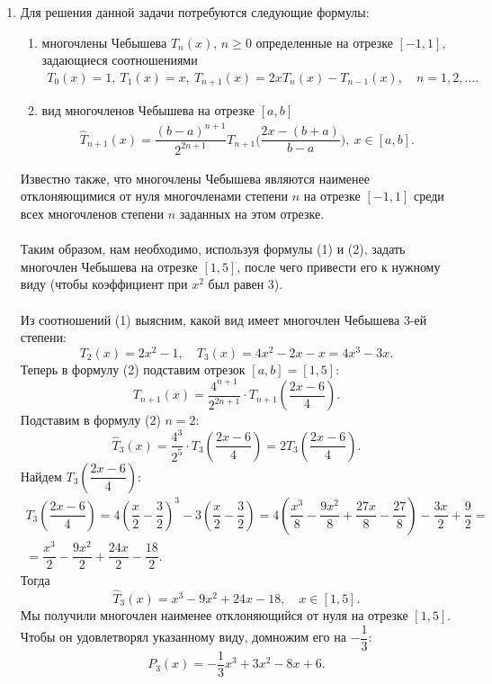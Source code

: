 \documentclass[a4paper, 12pt]{article}
\renewcommand{\geq}{\geqslant}
\begin{document}
\begin{enumerate}
	\newpage
	\item 
	\hypertarget{t9}{}
	Для решения данной задачи потребуются следующие формулы:
	\begin{enumerate}
		\item многочлены Чебышева $T_n(x)$, $n\geq 0$ определенные на отрезке $[-1,1]$, задающиеся соотношениями 
		\begin{eqnarray}
			T_0(x)=1,\ T_1(x) = x,\ T_{n+1}(x) = 2xT_n(x) - T_{n-1}(x),\quad n=1,2,\ldots.
		\end{eqnarray}
		\item вид многочленов Чебышева на отрезке $[a,b]$ 
		\begin{eqnarray}
			\hat T_{n+1}(x) = \dfrac{(b-a)^{n+1}}{2^{2n+1}} T_{n+1}\Big(\dfrac{2x - (b+a)}{b-a}\Big),\ x\in [a,b].
		\end{eqnarray}
	\end{enumerate}
	Известно также, что многочлены Чебышева являются наименее отклоняющимися от нуля многочленами степени $n$ на отрезке $[-1,1]$ среди всех многочленов степени $n$ заданных на этом отрезке.\\\\
	Таким образом, нам необходимо, используя формулы (1) и (2), задать многочлен Чебышева на отрезке $[1,5]$, после чего привести его к нужному виду (чтобы коэффициент при $x^2$ был равен 3).\\\\
	Из соотношений (1) выясним, какой вид имеет многочлен Чебышева 3-ей степени:
	$$T_2(x) = 2x^2 - 1,\quad T_3(x) = 4x^2 - 2x - x = 4x^3 - 3x.$$
	Теперь в формулу (2) подставим отрезок $[a,b] = [1,5]$:
	$$T_{n+1}(x) = \dfrac{4^{n+1}}{2^{2n + 1}}\cdot T_{n+1}\left(\dfrac{2x - 6}{4}\right).$$
	Подставим в формулу (2) $n=2$:
	$$\hat T_{3}(x) = \dfrac{4^{3}}{2^{5}}\cdot T_{3}\left(\dfrac{2x - 6}{4}\right)=2T_{3}\left(\dfrac{2x - 6}{4}\right).$$
	Найдем $T_{3}\left(\dfrac{2x - 6}{4}\right)$:
	\begin{multline*}
		T_{3}\left(\dfrac{2x - 6}{4}\right) = 4\left(\dfrac{x}{2} - \dfrac{3}{2}\right)^3 - 3\left(\dfrac{x}{2} - \dfrac{3}{2}\right) = 4\left(\dfrac{x^3}{8} - \dfrac{9x^2}{8} + \dfrac{27x}{8}-\dfrac{27}{8}\right) - \dfrac{3x}{2} + \dfrac{9}{2} =\\ = \dfrac{x^3}{2} - \dfrac{9x^2}{2} + \dfrac{24x}{2} - \dfrac{18}{2}.
	\end{multline*}
	Тогда $$\hat T_3(x) = x^3 - 9x^2 + 24x - 18,\quad x\in [1,5].$$
	Мы получили многочлен наименее отклоняющийся от нуля на отрезке $[1,5]$. Чтобы он удовлетворял указанному виду, домножим его на $-\dfrac13$:
	$$P_3(x) = -\dfrac13 x^3 + 3x^2 - 8x + 6.$$
	

\end{enumerate}
\end{document}
